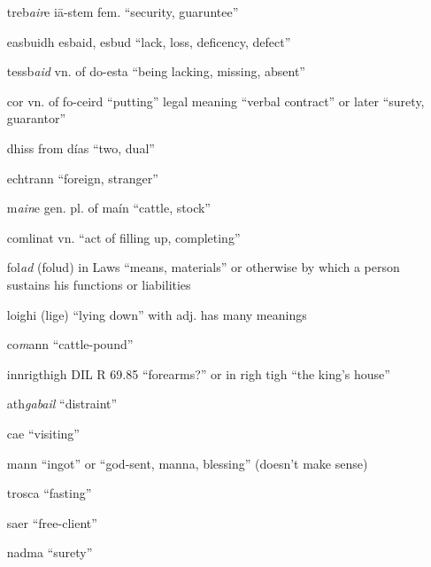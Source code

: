 \documentclass[11pt]{article}
\begin{document}
\begin{enumerate}
  \item[treb\emph{air}e] i\={a}-stem fem. \enquote{security, guaruntee}

  \item[easbuidh] esbaid, esbud \enquote{lack, loss, deficency, defect}

  \item[tessb\emph{aid}] vn. of do-esta \enquote{being lacking, missing, absent}

  \item[cor] vn. of fo-ceird \enquote{putting} legal meaning \enquote{verbal contract} or later \enquote{surety, guarantor}

  \item[dhiss] from d\'{i}as \enquote{two, dual}

  \item[echtrann] \enquote{foreign, stranger}

  \item[m\emph{ain}e] gen. pl. of ma\'{i}n \enquote{cattle, stock}

  \item[comlinat] vn. \enquote{act of filling up, completing}

  \item[fol\emph{ad}] (folud) in Laws \enquote{means, materials} or otherwise by which a person sustains his functions or liabilities

  \item[loighi] (lige) \enquote{lying down} with adj. has many meanings

  \item[co\emph{m}ann] \enquote{cattle-pound}

  \item[innrigthigh] DIL R 69.85 \enquote{forearms?} or in righ tigh \enquote{the king's house}

  \item[ath\emph{gabail}] \enquote{distraint}

  \item[cae] \enquote{visiting}

  \item[mann] \enquote{ingot} or \enquote{god-sent, manna, blessing} (doesn't make sense)

  \item[trosca] \enquote{fasting}

  \item[saer] \enquote{free-client}

  \item[nadma] \enquote{surety}


\end{enumerate}
\end{document}

